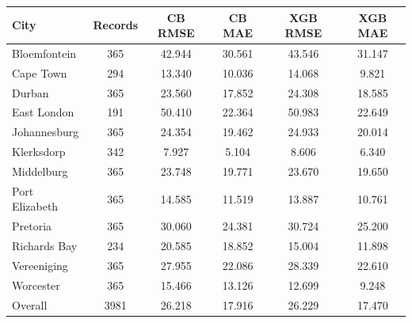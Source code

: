 \begin{tabular}{lccccc}
\toprule
City & Records & CB RMSE & CB MAE & XGB RMSE & XGB MAE \\ \midrule
Bloemfontein & 365 & 42.944 & 30.561 & 43.546 & 31.147 \\
Cape Town & 294 & 13.340 & 10.036 & 14.068 & 9.821 \\
Durban & 365 & 23.560 & 17.852 & 24.308 & 18.585 \\
East London & 191 & 50.410 & 22.364 & 50.983 & 22.649 \\
Johannesburg & 365 & 24.354 & 19.462 & 24.933 & 20.014 \\
Klerksdorp & 342 & 7.927 & 5.104 & 8.606 & 6.340 \\
Middelburg & 365 & 23.748 & 19.771 & 23.670 & 19.650 \\
Port Elizabeth & 365 & 14.585 & 11.519 & 13.887 & 10.761 \\
Pretoria & 365 & 30.060 & 24.381 & 30.724 & 25.200 \\
Richards Bay & 234 & 20.585 & 18.852 & 15.004 & 11.898 \\
Vereeniging & 365 & 27.955 & 22.086 & 28.339 & 22.610 \\
Worcester & 365 & 15.466 & 13.126 & 12.699 & 9.248 \\
Overall & 3981 & 26.218 & 17.916 & 26.229 & 17.470 \\
\bottomrule
\end{tabular}
